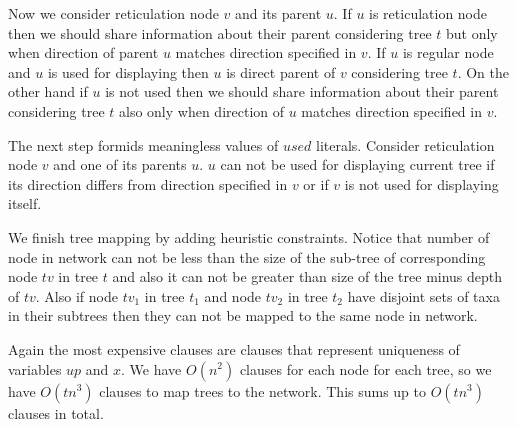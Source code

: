 \documentclass[runningheads, envcountsame, a4paper]{llncs}
\begin{document}
Now we consider reticulation node $v$ and its parent $u$. If $u$ is reticulation node then we should share information 
about their parent considering tree $t$ but only when direction of parent $u$ matches direction specified in $v$. 
If $u$ is regular node and $u$ is used for displaying then $u$ is direct parent of $v$ considering tree $t$.
On the other hand if $u$ is not used then we should share information about their parent considering tree $t$ also 
only when direction of $u$ matches direction specified in $v$.

The next step formids meaningless values of $used$ literals. Consider reticulation node $v$ and one of its parents $u$. 
$u$ can not be used for displaying current tree if its direction differs from direction specified in $v$ or if $v$ is 
not used for displaying itself.

We finish tree mapping by adding heuristic constraints. Notice that number of node in network can not be less than the 
size of the sub-tree of corresponding node $tv$ in tree $t$ and also it can not be greater than size of the tree minus 
depth of $tv$. Also if node $tv_1$ in tree $t_1$ and node $tv_2$ in tree $t_2$ have disjoint sets of taxa in their 
subtrees then they can not be mapped to the same node in network.

Again the most expensive clauses are clauses that represent uniqueness of variables $up$ and $x$. We have $O(n^2)$ clauses for
each node for each tree, so we have $O(tn^3)$ clauses to map trees to the network. This sums up to $O(tn^3)$ clauses in total.
\end{document}
